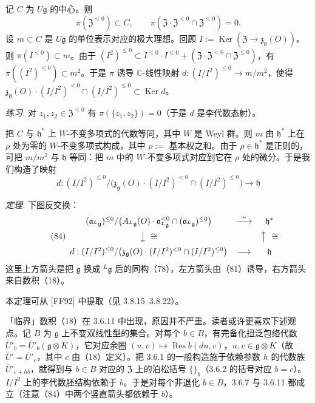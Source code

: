  记 $C$ 为 $U\mathfrak{g}$ 的中心。则
\[
  \pi(\mathfrak{Z}^{\le 0}) \subset C, \qquad \pi(\mathfrak{Z}\cdot\mathfrak{Z}^{<0} \cap \mathfrak{Z}^{\le 0}) = 0.
\]
设 $m \subset C$ 是 $U\mathfrak{g}$ 的单位表示对应的极大理想。回顾 $I := \operatorname{Ker}(\mathfrak{Z} \to \mathfrak{z}_{\mathfrak{g}}(O))$。则 $\pi(I^{\le 0}) \subset m$。由于 $(I^{2})^{\le 0} \subset I^{\le 0}\cdot I^{\le 0} + (\mathfrak{Z}\cdot\mathfrak{Z}^{<0} \cap \mathfrak{Z}^{\le 0})$，有 $\pi((I^{2})^{\le 0}) \subset m^{2}$。于是 $\pi$ 诱导 $\mathbb{C}$-线性映射 $d: (I/I^{2})^{\le 0} \to m/m^{2}$，使得 $\mathfrak{z}_{\mathfrak{g}}(O)\cdot(I/I^{2})^{<0} \cap (I/I^{2})^{\le 0} \subset \operatorname{Ker} d$。


\emph{练习.} 对 $z_{1}, z_{2} \in \mathfrak{Z}^{\le 0}$ 有 $\pi(\{z_{1}, z_{2}\}) = 0$（于是 $d$ 是李代数态射）。

 把 $C$ 与 $\mathfrak{h}^{*}$ 上 $W$-不变多项式的代数等同，其中 $W$ 是 Weyl 群。则 $m$ 由 $\mathfrak{h}^{*}$ 上在 $\rho$ 处为零的 $W$-不变多项式构成，其中 $\rho :=$ 基本权之和。由于 $\rho \in \mathfrak{h}^{*}$ 是正则的，可把 $m/m^{2}$ 与 $\mathfrak{h}$ 等同：把 $m$ 中的 $W$-不变多项式对应到它在 $\rho$ 处的微分。于是我们构造了映射
\begin{equation}\tag{83}
d: (I/I^{2})^{\le 0}/\bigl(\mathfrak{z}_{\mathfrak{g}}(O)\cdot(I/I^{2})^{<0} \cap (I/I^{2})^{\le 0}\bigr) \to \mathfrak{h}
\end{equation}

 \emph{定理.} 下图反交换：
\begin{equation}\tag{84}
\begin{array}{ccc}
(\mathfrak{a}_{{}^{L}\mathfrak{g}})^{\le 0}/\bigl(A_{{}^{L}\mathfrak{g}}(O)\cdot\mathfrak{a}_{{}^{L}\mathfrak{g}}^{<0} \cap (\mathfrak{a}_{{}^{L}\mathfrak{g}})^{\le 0}\bigr) & \xrightarrow{\ \sim\ } & \mathfrak{h}^{*}\\[2mm]
\big\downarrow\ \cong & & \big\uparrow\ \cong\\[2mm]
d: (I/I^{2})^{\le 0}/\bigl(\mathfrak{z}_{\mathfrak{g}}(O)\cdot(I/I^{2})^{<0} \cap (I/I^{2})^{\le 0}\bigr) & \longrightarrow & \mathfrak{h}
\end{array}
\end{equation}
这里上方箭头是把 $\mathfrak{g}$ 换成 ${}^{L}\mathfrak{g}$ 后的同构（78），左方箭头由（81）诱导，右方箭头来自数积（18）。

本定理可从 [FF92] 中提取（见 3.8.15--3.8.22）。

 「临界」数积（18）在 3.6.11 中出现，原因并不严重。读者或许更喜欢下述观点。记 $B$ 为 $\mathfrak{g}$ 上不变双线性型的集合。对每个 $b \in B$，有完备化扭泛包络代数 $\overline{U}'_{b} = \overline{U}'_{b}(\mathfrak{g}\otimes K)$，它对应余圈 $(u, v) \mapsto \operatorname{Res} b(du, v)$，$u, v \in \mathfrak{g}\otimes K$（故 $\overline{U}' = \overline{U}'_{c}$，其中 $c$ 由（18）定义）。把 3.6.1 的一般构造施于依赖参数 $h$ 的代数族 $\overline{U}'_{c+hb}$，就得到与 $b \in B$ 对应的 $\mathfrak{Z}$ 上的泊松括号 $\{\}_{b}$（3.6.2 的括号对应 $b = c$）。$I/I^{2}$ 上的李代数胚结构依赖于 $b$。于是对每个非退化 $b \in B$，3.6.7 与 3.6.11 都成立（注意（84）中两个竖直箭头都依赖于 $b$）。

